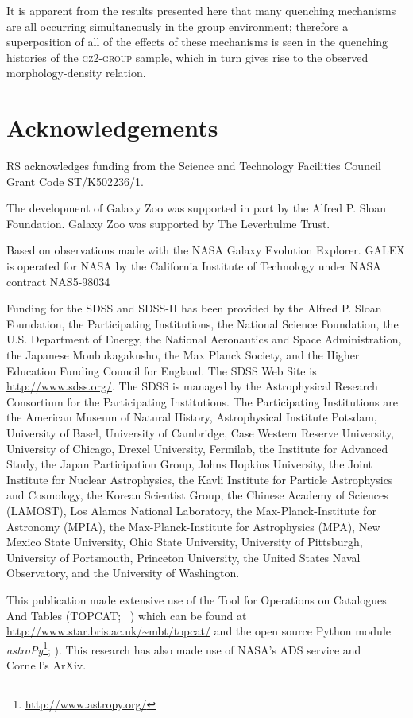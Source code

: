 \documentclass[useAMS,usenatbib]{mn2e}
\begin{document}
It is apparent from the results presented here that many quenching mechanisms are all occurring simultaneously in the group environment; therefore a superposition of all of the effects of these mechanisms is seen in the quenching histories of the \textsc{gz2-group} sample, which in turn gives rise to the observed morphology-density relation. 

\section*{Acknowledgements}

RS acknowledges funding from the Science and Technology Facilities Council Grant Code ST/K502236/1. 

The development of Galaxy Zoo was supported in part by the Alfred P. Sloan Foundation. Galaxy Zoo was supported by The Leverhulme Trust. 

Based on observations made with the NASA Galaxy Evolution Explorer.  GALEX is operated for NASA by the California Institute of Technology under NASA contract NAS5-98034

Funding for the SDSS and SDSS-II has been provided by the Alfred P. Sloan Foundation, the Participating Institutions, the National Science Foundation, the U.S. Department of Energy, the National Aeronautics and Space Administration, the Japanese Monbukagakusho, the Max Planck Society, and the Higher Education Funding Council for England. The SDSS Web Site is \url{http://www.sdss.org/}.
The SDSS is managed by the Astrophysical Research Consortium for the Participating Institutions. The Participating Institutions are the American Museum of Natural History, Astrophysical Institute Potsdam, University of Basel, University of Cambridge, Case Western Reserve University, University of Chicago, Drexel University, Fermilab, the Institute for Advanced Study, the Japan Participation Group, Johns Hopkins University, the Joint Institute for Nuclear Astrophysics, the Kavli Institute for Particle Astrophysics and Cosmology, the Korean Scientist Group, the Chinese Academy of Sciences (LAMOST), Los Alamos National Laboratory, the Max-Planck-Institute for Astronomy (MPIA), the Max-Planck-Institute for Astrophysics (MPA), New Mexico State University, Ohio State University, University of Pittsburgh, University of Portsmouth, Princeton University, the United States Naval Observatory, and the University of Washington.

This publication made extensive use of the Tool for Operations on Catalogues And Tables (TOPCAT; ~\citealt{taylor05}) which can be found at \url{http://www.star.bris.ac.uk/~mbt/topcat/} and the open source Python module \emph{astroPy}\footnote{\url{http://www.astropy.org/}}; \citealt{astropy13}). This research has also made use of NASA's ADS service and Cornell's ArXiv. 



  
\end{document}
